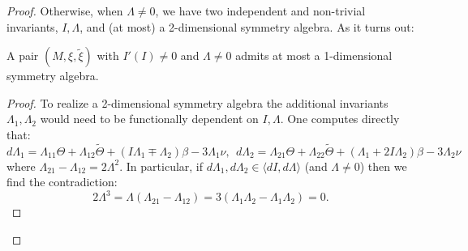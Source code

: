 \documentclass[10pt,a4paper]{amsart}
\begin{document}
\begin{proof}
    
    Otherwise, when $\Lambda\ne 0$, we have two independent and non-trivial invariants, $I, \Lambda$, and (at most) a 2-dimensional symmetry algebra. As it turns out:
    \begin{lem}
        A pair $(M, \xi, \tilde\xi)$ with $I'(I)\ne 0$ and $\Lambda\ne 0$ admits at most a 1-dimensional symmetry algebra.
    \end{lem}
    \begin{proof}
        To realize a 2-dimensional symmetry algebra the additional invariants $\Lambda_1, \Lambda_2$ would need to be functionally dependent on $I, \Lambda$.
    One computes directly that:
    \[ d\Lambda_1 = \Lambda_{11}\Theta + \Lambda_{12}\tilde\Theta + (I\Lambda_1 \mp \Lambda_2) \beta - 3\Lambda_1\nu, ~~ d\Lambda_2 = \Lambda_{21}\Theta + \Lambda_{22} \tilde\Theta + (\Lambda_1 + 2I\Lambda_2)\beta - 3\Lambda_2\nu \]
where $\Lambda_{21} - \Lambda_{12} = 2 \Lambda^2$.
In particular, if $d\Lambda_1, d\Lambda_2 \in \langle dI, d\Lambda\rangle$ (and $\Lambda\ne 0$) then we find the contradiction:
\[ 2\Lambda^3 = \Lambda(\Lambda_{21} - \Lambda_{12}) = 3( \Lambda_1\Lambda_2 - \Lambda_1\Lambda_2) = 0. \]
    \end{proof}


\end{proof}
\end{document}
